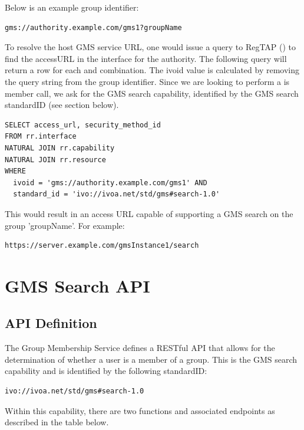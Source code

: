 \documentclass[11pt,a4paper]{ivoa}
\begin{document}
Below is an example group identifier:

\begin{verbatim}
gms://authority.example.com/gms1?groupName
\end{verbatim}

To resolve the host GMS service URL, one would issue a query to RegTAP (\citep{2014ivoa.spec.1208D}) to find the accessURL in the interface for the authority.  The following query will return a row for each  and  combination.  The ivoid value is calculated by removing the query string from the group identifier.  Since we are looking to perform a is member call, we ask for the GMS search capability, identified by the GMS search standardID (see section below).

\begin{verbatim}
SELECT access_url, security_method_id
FROM rr.interface
NATURAL JOIN rr.capability
NATURAL JOIN rr.resource
WHERE
  ivoid = 'gms://authority.example.com/gms1' AND
  standard_id = 'ivo://ivoa.net/std/gms#search-1.0'
\end{verbatim}

This would result in an access URL capable of supporting a GMS search on the group 'groupName'.  For example:

\begin{verbatim}
https://server.example.com/gmsInstance1/search
\end{verbatim}

\section{GMS Search API}

\subsection{API Definition}

The Group Membership Service defines a RESTful API \citep{fielding00} that allows for the determination of whether a user is a member of a group.  This is the GMS search capability and is identified by the following standardID:

\begin{verbatim}
ivo://ivoa.net/std/gms#search-1.0
\end{verbatim}

Within this capability, there are two functions and associated endpoints as described in the table below.
\end{document}
